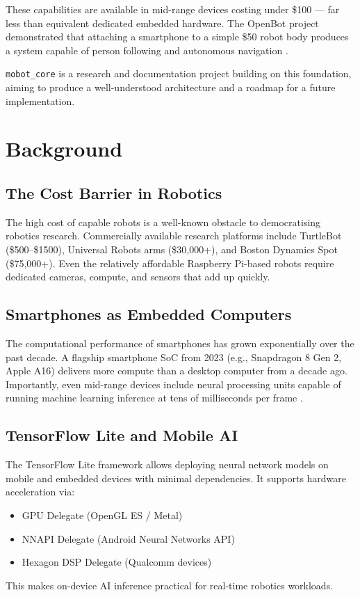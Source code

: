 \documentclass[12pt,a4paper]{article}
\begin{document}
These capabilities are available in mid-range devices costing under \$100 — far less than
equivalent dedicated embedded hardware. The OpenBot project demonstrated that attaching a
smartphone to a simple \$50 robot body produces a system capable of person following and
autonomous navigation \citep{openbot2021}.

\texttt{mobot\_core} is a research and documentation project building on this foundation,
aiming to produce a well-understood architecture and a roadmap for a future implementation.

\section{Background}
\label{sec:background}

\subsection{The Cost Barrier in Robotics}

The high cost of capable robots is a well-known obstacle to democratising robotics research.
Commercially available research platforms include TurtleBot (\$500--\$1500), Universal Robots
arms (\$30,000+), and Boston Dynamics Spot (\$75,000+). Even the relatively affordable
Raspberry Pi-based robots require dedicated cameras, compute, and sensors that add up quickly.

\subsection{Smartphones as Embedded Computers}

The computational performance of smartphones has grown exponentially over the past decade.
A flagship smartphone SoC from 2023 (e.g., Snapdragon 8 Gen 2, Apple A16) delivers more
compute than a desktop computer from a decade ago. Importantly, even mid-range devices include
neural processing units capable of running machine learning inference at tens of milliseconds
per frame \citep{openbot2021}.

\subsection{TensorFlow Lite and Mobile AI}

The TensorFlow Lite framework \citep{tflite} allows deploying neural network models on
mobile and embedded devices with minimal dependencies. It supports hardware acceleration via:
\begin{itemize}
    \item GPU Delegate (OpenGL ES / Metal)
    \item NNAPI Delegate (Android Neural Networks API)
    \item Hexagon DSP Delegate (Qualcomm devices)
\end{itemize}
This makes on-device AI inference practical for real-time robotics workloads.
\end{document}
